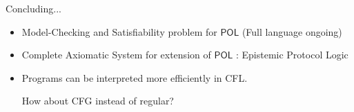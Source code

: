 \documentclass[usenames,dvipsnames]{beamer}
\newcommand{\POL}{\mathsf{POL}}
\begin{document}
\begin{frame}{Concluding...}
    \begin{itemize}
    \item  Model-Checking and Satisfiability problem for $\POL$ (Full language ongoing)
 
     \item Complete Axiomatic System for extension of $\POL$ : Epistemic Protocol Logic\footnotemark[1]

     \item Programs can be interpreted more efficiently in CFL.

     How about CFG instead of regular?
 \end{itemize}
\end{frame}

 
\end{document}
